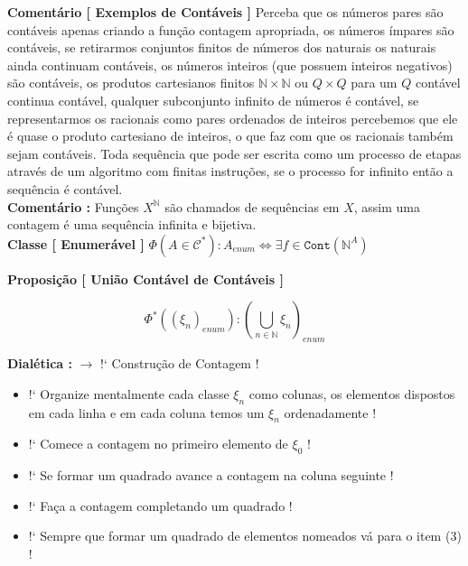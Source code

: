 \documentclass[10pt,a4paper]{report}
\begin{document}
\textbf{Comentário [ Exemplos de Contáveis ]} Perceba que os números pares são contáveis apenas criando a função contagem apropriada, os números ímpares são contáveis, se retirarmos conjuntos finitos de números dos naturais os naturais ainda continuam contáveis, os números inteiros (que possuem inteiros negativos) são contáveis, os produtos cartesianos finitos $ \mathbb{N} \times \mathbb{N} $ ou $ Q \times Q $ para um $Q$ contável continua contável, qualquer subconjunto infinito de números é contável, se representarmos os racionais como pares ordenados de inteiros percebemos que ele é quase o produto cartesiano de inteiros, o que faz com que os racionais também sejam contáveis. Toda sequência que pode ser escrita como um processo de etapas através de um algoritmo com finitas instruções, se o processo for infinito então a sequência é contável.\\

\textbf{Comentário :} Funções $X^{\mathbb{N}}$ são chamados de sequências em $X$, assim uma contagem é uma sequência infinita e bijetiva.\\

\textbf{Classe [ Enumerável ]} $ \Phi(A \in \mathcal{C}^*) : A_{enum} \iff \exists f \in \texttt{Cont}(\mathbb{N}^A) $

\hspace{\baselineskip}

\textbf{Proposição [ União Contável de Contáveis ]}

$$ \Phi^*( (\xi_n)_{enum} ) : (\bigcup\limits_{n \in \mathbb{N}} \xi_n )_{enum} $$

\textbf{Dialética :} $\rightarrow$ !` Construção de Contagem !

\begin{itemize}
	\item[ (1) ] !` Organize mentalmente cada classe $\xi_n$ como colunas, os elementos dispostos em cada linha e em cada coluna temos um $\xi_n$ ordenadamente !
	\item[ (2) ] !` Comece a contagem no primeiro elemento de $\xi_0$ !
	\item[ (3) ] !` Se formar um quadrado avance a contagem na coluna seguinte !
	\item[ (4) ] !` Faça a contagem completando um quadrado !
	\item[ (5) ] !` Sempre que formar um quadrado de elementos nomeados vá para o item (3) !
\end{itemize}
\end{document}
